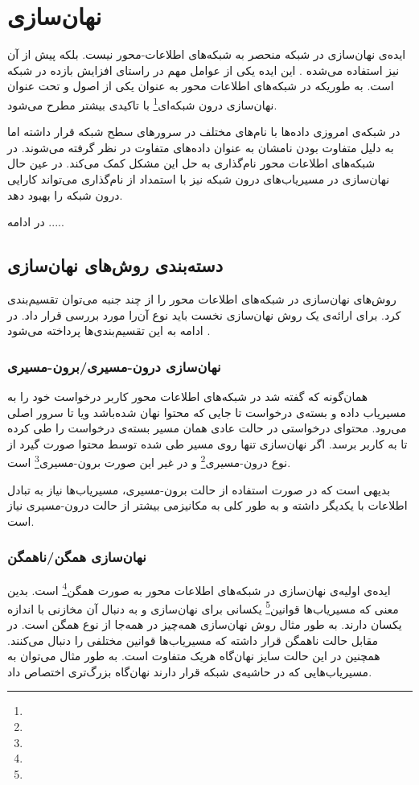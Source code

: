 
\chapter{نهان‌سازی}

ایده‌ی نهان‌سازی در شبکه منحصر به شبکه‌های اطلاعات-محور نیست. بلکه پیش از آن نیز استفاده می‌شده \cite{adaptive_web_caching} \cite{location_cache} \cite{web_caching}. این ایده یکی از عوامل مهم در راستای افزایش بازده در شبکه است. به طوریکه در شبکه‌های اطلاعات محور به عنوان یکی از اصول و تحت عنوان نهان‌سازی درون شبکه‌ای\footnote{} با تاکیدی بیشتر مطرح می‌شود.

در شبکه‌ی امروزی داده‌ها با نام‌های مختلف در سرورهای سطح شبکه قرار داشته اما به دلیل متفاوت بودن نامشان به عنوان داده‌های متفاوت در نظر گرفته می‌شوند. در شبکه‌های اطلاعات محور نام‌گذاری به حل این مشکل کمک می‌کند. در عین حال نهان‌سازی در مسیریاب‌های درون شبکه نیز با استمداد از نام‌گذاری می‌تواند کارایی درون شبکه را بهبود دهد.

در ادامه ..... 


\section{دسته‌بندی روش‌های نهان‌سازی}
روش‌های نهان‌سازی در شبکه‌های اطلاعات محور را از چند جنبه می‌توان تقسیم‌بندی کرد. برای ارائه‌ی یک روش نهان‌سازی نخست باید نوع آن‌را مورد بررسی قرار داد. در ادامه به این تقسیم‌بندی‌ها پرداخته می‌شود \cite{survey_caching}.

\subsection{نهان‌سازی درون-مسیری/برون-مسیری}
همان‌گونه که گفته شد در شبکه‌های اطلاعات محور کاربر درخواست خود را به مسیریاب داده و بسته‌ی درخواست تا جایی که محتوا نهان شده‌باشد ویا تا سرور اصلی می‌رود. محتوای درخواستی در حالت عادی همان مسیر بسته‌ی درخواست را طی کرده تا به کاربر برسد. اگر نهان‌سازی تنها روی مسیر طی شده توسط محتوا صورت گیرد از نوع درون-مسیری\footnote{} و در غیر این صورت برون-مسیری\footnote{} است.

بدیهی است که در صورت استفاده از حالت برون-مسیری، مسیریاب‌ها نیاز به تبادل اطلاعات با یکدیگر داشته و به طور کلی به مکانیزمی بیشتر از حالت درون-مسیری نیاز است.


\subsection{نهان‌سازی همگن/ناهمگن}
ایده‌ی اولیه‌ی نهان‌سازی در شبکه‌های اطلاعات محور به صورت همگن\footnote{} است. بدین معنی که مسیریاب‌ها قوانین\footnote{} یکسانی برای نهان‌سازی و به دنبال آن مخازنی با اندازه یکسان دارند. به طور مثال روش‌ نهان‌سازی همه‌چیز در همه‌جا از نوع همگن است. در مقابل حالت ناهمگن قرار داشته که مسیریاب‌ها قوانین مختلفی را دنبال می‌کنند. همچنین در این حالت سایز نهان‌گاه هریک متفاوت است. به طور مثال می‌توان به مسیریاب‌هایی که در حاشیه‌ی شبکه قرار دارند نهان‌گاه بزرگ‌تری اختصاص داد.

